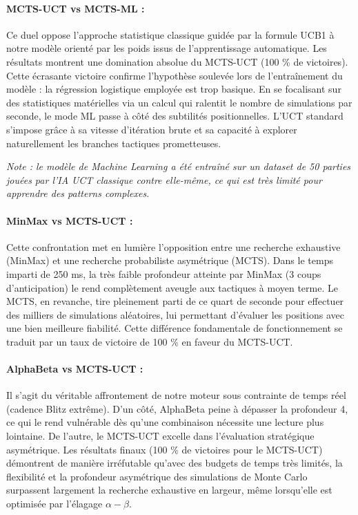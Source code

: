 \documentclass[a4paper]{article}
\begin{document}
\paragraph{MCTS-UCT vs MCTS-ML :}
Ce duel oppose l'approche statistique classique guidée par la formule UCB1 à notre modèle orienté par les poids issus de l'apprentissage automatique. 
Les résultats montrent une domination absolue du MCTS-UCT (100 \% de victoires). Cette écrasante victoire confirme l'hypothèse soulevée lors de l'entraînement 
du modèle : la régression logistique employée est trop basique. En se focalisant sur des statistiques matérielles via un calcul qui ralentit le nombre de 
simulations par seconde, le mode ML passe à côté des subtilités positionnelles. L'UCT standard s'impose grâce à sa vitesse d'itération brute et sa capacité 
à explorer naturellement les branches tactiques prometteuses.

\noindent\textit{Note : le modèle de Machine Learning a été entraîné sur un dataset de 50 parties jouées par l'IA UCT classique contre elle-même, ce qui est 
très limité pour apprendre des patterns complexes.}


\paragraph{MinMax vs MCTS-UCT :}
Cette confrontation met en lumière l'opposition entre une recherche exhaustive (MinMax) et une recherche probabiliste asymétrique (MCTS). Dans le temps 
imparti de 250 ms, la très faible profondeur atteinte par MinMax (3 coups d'anticipation) le rend complètement aveugle aux tactiques à moyen terme. Le 
MCTS, en revanche, tire pleinement parti de ce quart de seconde pour effectuer des milliers de simulations aléatoires, lui permettant d'évaluer les 
positions avec une bien meilleure fiabilité. Cette différence fondamentale de fonctionnement se traduit par un taux de victoire de 100 \% en faveur du MCTS-UCT.

\paragraph{AlphaBeta vs MCTS-UCT :}
Il s'agit du véritable affrontement de notre moteur sous contrainte de temps réel (cadence Blitz extrême). D'un côté, AlphaBeta peine à dépasser 
la profondeur 4, ce qui le rend vulnérable dès qu'une combinaison nécessite une lecture plus lointaine. De l'autre, le MCTS-UCT excelle dans l'évaluation
 stratégique asymétrique. Les résultats finaux (100 \% de victoires pour le MCTS-UCT) démontrent de manière irréfutable qu'avec des budgets de temps 
 très limités, la flexibilité et la profondeur asymétrique des simulations de Monte Carlo surpassent largement la recherche exhaustive en largeur, 
 même lorsqu'elle est optimisée par l'élagage $\alpha-\beta$.
\end{document}
